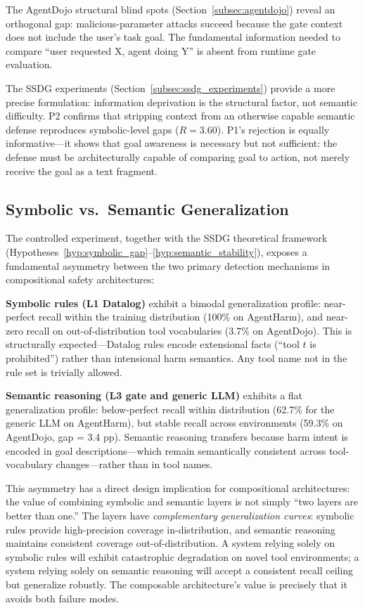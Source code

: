 \documentclass{article}
\theoremstyle{definition}
\begin{document}
The AgentDojo structural blind spots (Section~\ref{subsec:agentdojo})
reveal an orthogonal gap: malicious-parameter attacks succeed because the
gate context does not include the user's task goal. The fundamental
information needed to compare ``user requested X, agent doing Y'' is absent
from runtime gate evaluation.

The SSDG experiments (Section~\ref{subsec:ssdg_experiments}) provide
a more precise formulation: information deprivation is the structural
factor, not semantic difficulty. P2 confirms that stripping context
from an otherwise capable semantic defense reproduces symbolic-level
gaps ($R = 3.60$). P1's rejection is equally informative---it shows
that goal awareness is necessary but not sufficient: the defense must
be architecturally capable of comparing goal to action, not merely
receive the goal as a text fragment.

\subsection{Symbolic vs.\ Semantic Generalization}
\label{subsec:disc_generalization}

The controlled experiment, together with the SSDG theoretical framework
(Hypotheses~\ref{hyp:symbolic_gap}--\ref{hyp:semantic_stability}),
exposes a fundamental asymmetry between the two
primary detection mechanisms in compositional safety architectures:

\textbf{Symbolic rules (L1 Datalog)} exhibit a bimodal generalization
profile: near-perfect recall within the training distribution (100\% on
AgentHarm), and near-zero recall on out-of-distribution tool vocabularies
(3.7\% on AgentDojo). This is structurally expected---Datalog rules
encode extensional facts (``tool $t$ is prohibited'') rather than
intensional harm semantics. Any tool name not in the rule set is
trivially allowed.

\textbf{Semantic reasoning (L3 gate and generic LLM)} exhibits a flat
generalization profile: below-perfect recall within distribution
(62.7\% for the generic LLM on AgentHarm), but stable recall across
environments (59.3\% on AgentDojo, gap = 3.4 pp). Semantic reasoning
transfers because harm intent is encoded in goal descriptions---which
remain semantically consistent across tool-vocabulary changes---rather
than in tool names.

This asymmetry has a direct design implication for compositional
architectures: the value of combining symbolic and semantic layers is
not simply ``two layers are better than one.'' The layers have
\emph{complementary generalization curves}: symbolic rules provide
high-precision coverage in-distribution, and semantic reasoning maintains
consistent coverage out-of-distribution. A system relying solely on
symbolic rules will exhibit catastrophic degradation on novel tool
environments; a system relying solely on semantic reasoning will accept
a consistent recall ceiling but generalize robustly. The composable
architecture's value is precisely that it avoids both failure modes.
\end{document}
